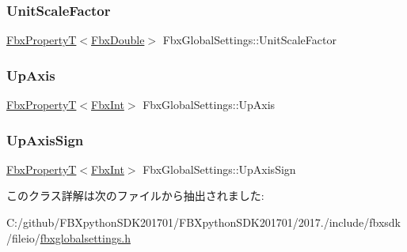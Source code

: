 \subsubsection{\texorpdfstring{Unit\+Scale\+Factor}{UnitScaleFactor}}
{\footnotesize\ttfamily \hyperlink{class_fbx_property_t}{Fbx\+PropertyT}$<$\hyperlink{fbxtypes_8h_a171e72a1c46fc15c1a6c9c31948c1c5b}{Fbx\+Double}$>$ Fbx\+Global\+Settings\+::\+Unit\+Scale\+Factor\hspace{0.3cm}{\ttfamily [protected]}}

\mbox{\label{class_fbx_global_settings_a58ba7d81b79cba1243bfb4103b00f4f4}} 
\subsubsection{\texorpdfstring{Up\+Axis}{UpAxis}}
{\footnotesize\ttfamily \hyperlink{class_fbx_property_t}{Fbx\+PropertyT}$<$\hyperlink{fbxtypes_8h_a088fa96de3b0b3ea69f0f6afef525dfb}{Fbx\+Int}$>$ Fbx\+Global\+Settings\+::\+Up\+Axis\hspace{0.3cm}{\ttfamily [protected]}}

\mbox{\label{class_fbx_global_settings_a12aa2b225f1fcc4999c2830062411c5d}} 
\subsubsection{\texorpdfstring{Up\+Axis\+Sign}{UpAxisSign}}
{\footnotesize\ttfamily \hyperlink{class_fbx_property_t}{Fbx\+PropertyT}$<$\hyperlink{fbxtypes_8h_a088fa96de3b0b3ea69f0f6afef525dfb}{Fbx\+Int}$>$ Fbx\+Global\+Settings\+::\+Up\+Axis\+Sign\hspace{0.3cm}{\ttfamily [protected]}}



このクラス詳解は次のファイルから抽出されました\+:\begin{DoxyCompactItemize}
\item 
C\+:/github/\+F\+B\+Xpython\+S\+D\+K201701/\+F\+B\+Xpython\+S\+D\+K201701/2017./include/fbxsdk/fileio/\hyperlink{fbxglobalsettings_8h}{fbxglobalsettings.\+h}\end{DoxyCompactItemize}
